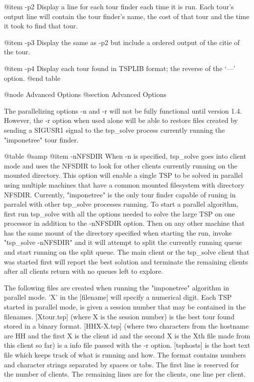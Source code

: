 @item -p2
Display a line for each tour finder each time it is run.  Each tour's output
line will contain the tour finder's name, the cost of that tour and the time
it took to find that tour.

@item -p3
Display the same as -p2 but include a ordered output of the citie of the tour.

@item -p4
Display each tour found in TSPLIB format; the reverse of the `---' option.
@end table

@node Advanced Options
@section Advanced Options

The parallelizing options -n and -r will not be fully functional until
version 1.4.  However, the -r option when used alone will be able to
restore files created by sending a SIGUSR1 signal to the tsp_solve process
currently running the "imponetree" tour finder.

@table @samp
@item -nNFSDIR
When -n is specified, tsp_solve goes into client mode and uses the NFSDIR to
look for other clients currently running on the mounted directory.  This
option will enable a single TSP to be solved in parallel using multiple
machines that have a common mounted filesystem with directory NFSDIR.
Currently, "imponetree" is the only tour finder capable of runing in parralel
with other tsp_solve processes running.  To start a parallel algorithm,
first run tsp_solve with all the options needed to solve the large TSP on
one processor in addition to the -nNFSDIR option.  Then on any other machine
that has the same mount of the directory specified when starting the run,
invoke "tsp_solve -nNFSDIR" and it will attempt to split the currently
running queue and start running on the split queue.  The main client or the
tsp_solve client that was started first will report the best solution and
terminate the remaining clients after all clients return with no queues left
to explore.

The following files are created when running the "imponetree" algorithm
in parallel mode.  'X' in the [filename] will specify a numerical digit.
Each TSP started in parallel mode, is given a session number that may be
contained in the filenames.  [Xtour.tsp] (where X is the session number)
is the best tour found stored in a binary format.  [HHX-X.tsp] (where
two characters from the hostname are HH and the first X is the client id
and the second X is the Xth file made from this client so far) is a info
file passed with the -r option.  [tsphosts] is the host text file which
keeps track of what is running and how.  The format contains numbers and
character strings separated by spaces or tabs.  The first line is reserved
for the number of clients.  The remaining lines are for the clients, one
line per client.

